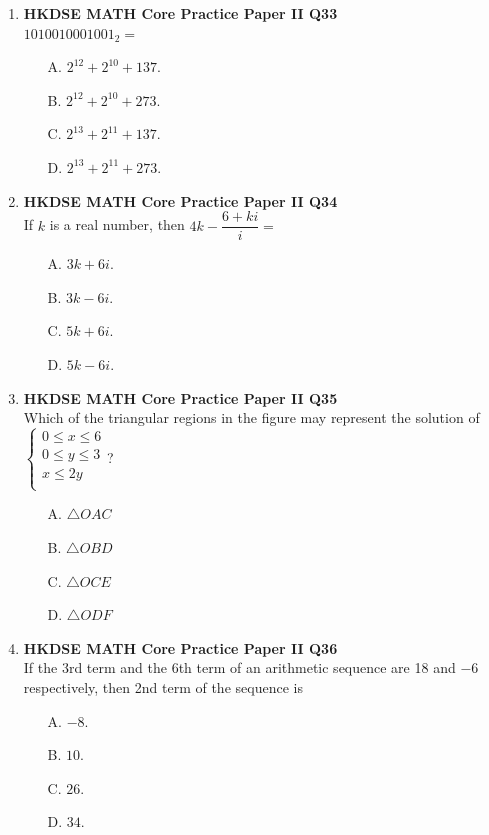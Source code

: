 \documentclass[12pt]{article}
\begin{document}
\begin{enumerate}
	\item \textbf{HKDSE MATH Core Practice Paper II Q33}\\
	$1010010001001_2 = $
	\begin{enumerate}
		\item[A.] $2^{12} + 2^{10} + 137$.
		\item[B.] $2^{12} + 2^{10} + 273$.
		\item[C.] $2^{13} + 2^{11} + 137$.
		\item[D.] $2^{13} + 2^{11} + 273$.
	\end{enumerate}
	
	\item \textbf{HKDSE MATH Core Practice Paper II Q34}\\
	If $k$ is a real number, then $4k - \dfrac{6 + ki}{i} = $
	\begin{enumerate}
		\item[A.] $3k + 6i$.
		\item[B.] $3k - 6i$.
		\item[C.] $5k + 6i$.
		\item[D.] $5k - 6i$.
	\end{enumerate}
	
	\item \textbf{HKDSE MATH Core Practice Paper II Q35}\\
	Which of the triangular regions in the figure may represent the solution of $\left\{
		\begin{matrix}
			0 \leq x \leq 6\\
			0 \leq y \leq 3\\
			x \leq 2y\\
		\end{matrix}\right.$?
	\begin{enumerate}
		\item[A.] $\triangle OAC$
		\item[B.] $\triangle OBD$
		\item[C.] $\triangle OCE$
		\item[D.] $\triangle ODF$
	\end{enumerate}
	
	\item \textbf{HKDSE MATH Core Practice Paper II Q36}\\
	If the 3rd term and the 6th term of an arithmetic sequence are 18 and $-6$ respectively, then 2nd term of the sequence is
	\begin{enumerate}
		\item[A.] $-8$.
		\item[B.] $10$.
		\item[C.] $26$.
		\item[D.] $34$.
	\end{enumerate}
	

\end{enumerate}
\end{document}
